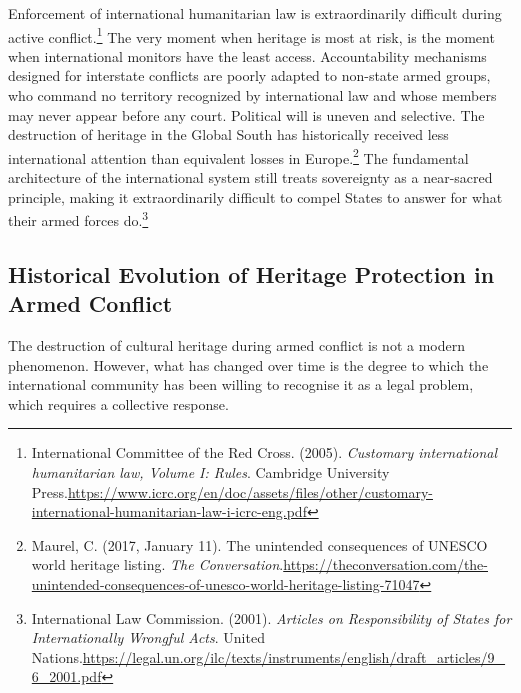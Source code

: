 Enforcement of international humanitarian law is extraordinarily difficult during active conflict.\footnote{International Committee of the Red Cross. (2005). \emph{Customary international humanitarian law, Volume I: Rules}. Cambridge University Press.\url{https://www.icrc.org/en/doc/assets/files/other/customary-international-humanitarian-law-i-icrc-eng.pdf}} The very moment when heritage is most at risk, is the moment when international monitors have the least access. Accountability mechanisms designed for interstate conflicts are poorly adapted to non-state armed groups, who command no territory recognized by international law and whose members may never appear before any court. Political will is uneven and selective. The destruction of heritage in the Global South has historically received less international attention than equivalent losses in Europe.\footnote{Maurel, C. (2017, January 11). The unintended consequences of UNESCO world heritage listing. \emph{The Conversation}.\url{https://theconversation.com/the-unintended-consequences-of-unesco-world-heritage-listing-71047}} The fundamental architecture of the international system still treats sovereignty as a near-sacred principle, making it extraordinarily difficult to compel States to answer for what their armed forces do.\footnote{International Law Commission. (2001). \emph{Articles on Responsibility of States for Internationally Wrongful Acts}. United Nations.\url{https://legal.un.org/ilc/texts/instruments/english/draft_articles/9_6_2001.pdf}}

\subsection{Historical Evolution of Heritage Protection in Armed Conflict}

The destruction of cultural heritage during armed conflict is not a modern phenomenon. However, what has changed over time is the degree to which the international community has been willing to recognise it as a legal problem, which requires a collective response.

